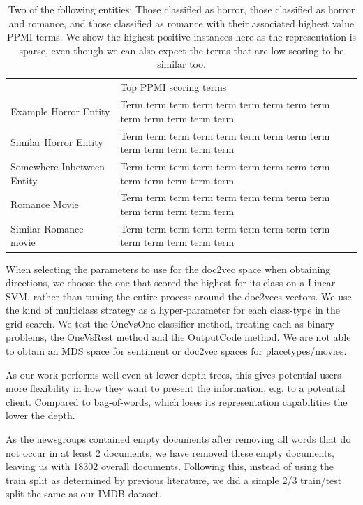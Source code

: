 \begin{table}[]
	\begin{tabular}{ll}
		& Top PPMI scoring terms                                                \\
		Example Horror Entity      & Term term term term term term term term term term term term term term \\
		Similar Horror Entity      & Term term term term term term term term term term term term term term \\
		Somewhere Inbetween Entity & Term term term term term term term term term term term term term term \\
		Romance Movie              & Term term term term term term term term term term term term term term \\
		Similar Romance movie      & Term term term term term term term term term term term term term term
	\end{tabular}
\caption{Two of the following entities: Those classified as horror, those classified as horror and romance, and those classified as romance with their associated highest value PPMI terms. We show the highest positive instances here as the representation is sparse, even though we can also expect the terms that are low scoring to be similar too.}
\label{table:PPMI_example}
\end{table}

When selecting the parameters to use for the doc2vec space when obtaining directions, we choose the one that scored the highest for its class on a Linear SVM, rather than tuning the entire process around the doc2vecs vectors.
We use the kind of multiclass strategy as a hyper-parameter for each class-type in the grid search. We test the OneVsOne classifier method, treating each as binary problems, the OneVsRest method and the OutputCode method.
We are not able to obtain an MDS space for sentiment or doc2vec spaces for placetypes/movies.

As our work performs well even at lower-depth trees, this gives potential users more flexibility in how they want to present the information, e.g. to a potential client. Compared to bag-of-words, which loses its representation capabilities the lower the depth.

As the newsgroups contained empty documents after removing all words that do not occur in at least 2 documents, we have removed these empty documents, leaving us with 18302 overall documents. Following this, instead of using the train split as determined by previous literature, we did a simple 2/3 train/test split the same as our IMDB dataset.

